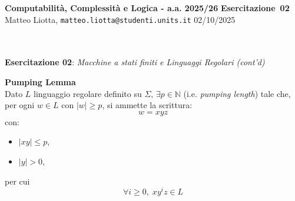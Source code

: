 \documentclass[a4paper,10pt]{article}
\makeatletter
\newcommand{\EsercitazioneNum}{02}
\newcommand{\Data}{02/10/2025}
\newcommand{\DocType}{Esercitazione} %
\newcommand{\FullTitle}{\DocType\ \EsercitazioneNum}
\newcommand{\Header}{
\noindent
  \small \textbf{Computabilità, Complessità e Logica - a.a. 2025/26} \hfill \textbf{\FullTitle} \\[0.2cm]
  \scriptsize Matteo Liotta, \texttt{matteo.liotta@studenti.units.it} \hfill \Data \\[0.2cm]
  \noindent\makebox[\linewidth]{\rule{\linewidth}{0.4pt}} \\[0.3cm]}
\makeatother
\begin{document}
\footnotesize  %
\Header\\[0.7cm]




\noindent\Large \textbf{Esercitazione \EsercitazioneNum}: \textit{Macchine a stati finiti e Linguaggi Regolari (cont'd)}\\[0cm]
\begin{osservazioni2}
    \textbf{Pumping Lemma}\\
    Dato $L$ linguaggio regolare definito su $\Sigma$, $\exists p \in \mathbb{N}$ (i.e. \emph{pumping length}) tale che, per ogni $w \in L$ con $|w|\geq p$, si ammette la scrittura:
    $$w = xyz$$
    con:
    \begin{itemize}
        \item $|xy| \leq p$,
        \item $|y| > 0$,
    \end{itemize}
    per cui $$\forall i \geq 0,\; x y^i z \in L$$
\end{osservazioni2}
\end{document}
